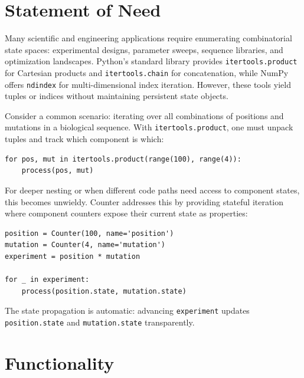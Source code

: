 \documentclass[10pt,a4paper,onecolumn]{article}
\begin{document}
\section{Statement of Need}

Many scientific and engineering applications require enumerating combinatorial 
state spaces: experimental designs, parameter sweeps, sequence libraries, and 
optimization landscapes. Python's standard library provides \texttt{itertools.product} 
for Cartesian products and \texttt{itertools.chain} for concatenation, while NumPy 
offers \texttt{ndindex} for multi-dimensional index iteration. However, these tools 
yield tuples or indices without maintaining persistent state objects.

Consider a common scenario: iterating over all combinations of positions and 
mutations in a biological sequence. With \texttt{itertools.product}, one must 
unpack tuples and track which component is which:

\begin{lstlisting}
for pos, mut in itertools.product(range(100), range(4)):
    process(pos, mut)
\end{lstlisting}

For deeper nesting or when different code paths need access to component states, 
this becomes unwieldy. Counter addresses this by providing stateful iteration 
where component counters expose their current state as properties:

\begin{lstlisting}
position = Counter(100, name='position')
mutation = Counter(4, name='mutation')
experiment = position * mutation

for _ in experiment:
    process(position.state, mutation.state)
\end{lstlisting}

The state propagation is automatic: advancing \texttt{experiment} updates 
\texttt{position.state} and \texttt{mutation.state} transparently.

\section{Functionality}
\end{document}
